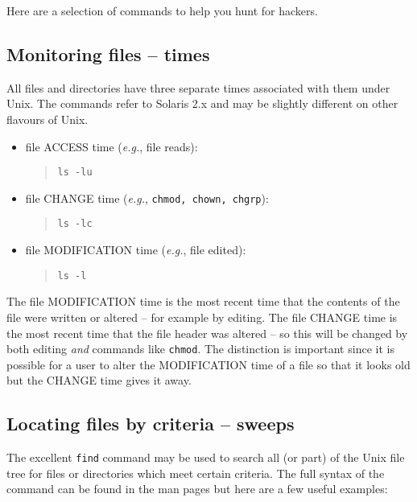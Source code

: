 Here are a selection of commands to help you hunt for hackers.

\subsection{Monitoring files -- times}

All files and directories have three separate times associated with them under
Unix. The commands refer to Solaris 2.x and may be slightly different
on other flavours of Unix.

\begin{itemize}
\item file ACCESS time (\emph{e.g.}, file reads):
\begin{quote} {\tt ls -lu} \end{quote}
\item file CHANGE time (\emph{e.g.}, {\tt chmod, chown, chgrp}):
\begin{quote} {\tt ls -lc} \end{quote}
\item file MODIFICATION time (\emph{e.g.}, file edited):
\begin{quote} {\tt ls -l} \end{quote}
\end{itemize}

The file MODIFICATION time is the most recent time that the contents of
the file were written or altered -- for example by editing. The file
CHANGE time is the most recent time that the file header was altered --
so this will be changed by both editing {\em and} commands like {\tt chmod}.
The distinction is important since it is possible for a user to alter
the MODIFICATION time of a file so that it looks old but the CHANGE
time gives it away.

\subsection{Locating files by criteria -- sweeps}

The excellent {\tt find} command may be used to search all (or part)
of the Unix file tree for files or directories which meet certain
criteria. The full syntax of the command can be found in the man pages
but here are a few useful examples:

